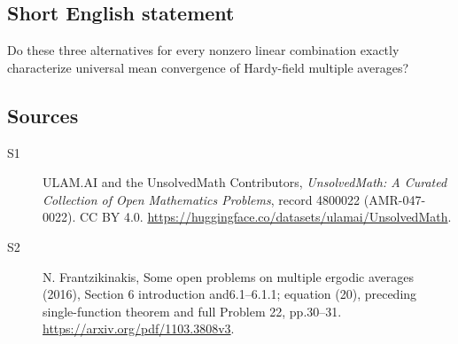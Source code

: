 \documentclass[11pt]{article}
\begin{document}
\subsection{Short English statement}
Do these three alternatives for every nonzero linear combination exactly characterize universal mean convergence of Hardy-field multiple averages?
\subsection{Sources}
\begin{description}
\item[\hypertarget{source:4800022:1}{S1}] ULAM.AI and the UnsolvedMath Contributors, \emph{UnsolvedMath: A Curated Collection of Open Mathematics Problems}, record 4800022 (AMR-047-0022). CC BY 4.0. \url{https://huggingface.co/datasets/ulamai/UnsolvedMath}.
\item[\hypertarget{source:4800022:2}{S2}] N. Frantzikinakis, Some open problems on multiple ergodic averages (2016), Section 6 introduction and6.1--6.1.1; equation (20), preceding single-function theorem and full Problem 22, pp.30--31. \url{https://arxiv.org/pdf/1103.3808v3}.
\end{description}
\label{end:4800022}
\end{document}
